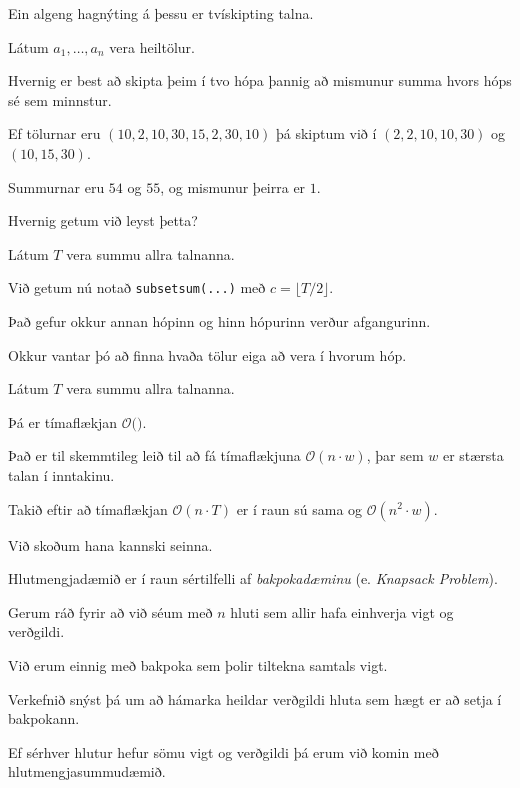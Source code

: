 {
	{
		\item<1-> Ein algeng hagnýting á þessu er tvískipting talna.
		\item<2-> Látum $a_1, \dots, a_n$ vera heiltölur.
		\item<3-> Hvernig er best að skipta þeim í tvo hópa þannig að mismunur summa hvors hóps sé sem minnstur.
		\item<4-> Ef tölurnar eru $(10, 2, 10, 30, 15, 2, 30, 10)$ þá skiptum við í $(2, 2, 10, 10, 30)$ og $(10, 15, 30)$.
		\item<5-> Summurnar eru $54$ og $55$, og mismunur þeirra er $1$.
	}
}

{
	{
		\item<1-> Hvernig getum við leyst þetta?
		\item<2-> Látum $T$ vera summu allra talnanna.
		\item<3-> Við getum nú notað \texttt{subsetsum(...)} með $c = \lfloor T/2 \rfloor$.
		\item<4-> Það gefur okkur annan hópinn og hinn hópurinn verður afgangurinn.
		\item<5-> Okkur vantar þó að finna hvaða tölur eiga að vera í hvorum hóp.
	}
}

{
}

{
	{
		\item<1-> Látum $T$ vera summu allra talnanna.
		\item<2-> Þá er tímaflækjan $\mathcal{O}($\onslide<3->{$n \cdot T$}$)$.
		\item<4-> Það er til skemmtileg leið til að fá tímaflækjuna $\mathcal{O}(n \cdot w)$, þar sem $w$ er stærsta talan í inntakinu.
		\item<5-> Takið eftir að tímaflækjan $\mathcal{O}(n \cdot T)$ er í raun sú sama og $\mathcal{O}(n^2 \cdot w)$.
		\item<6-> Við skoðum hana kannski seinna.
	}
}

{
	{
		\item<1-> Hlutmengjadæmið er í raun sértilfelli af \emph{bakpokadæminu} (e. \emph{Knapsack Problem}).
		\item<2-> Gerum ráð fyrir að við séum með $n$ hluti sem allir hafa einhverja vigt og verðgildi.
		\item<3-> Við erum einnig með bakpoka sem þolir tiltekna samtals vigt.
		\item<4-> Verkefnið snýst þá um að hámarka heildar verðgildi hluta sem hægt er að setja í bakpokann.
		\item<5-> Ef sérhver hlutur hefur sömu vigt og verðgildi þá erum við komin með hlutmengjasummudæmið.
	}
}

